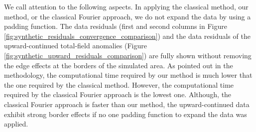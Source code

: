 We call attention to the following aspects. 
In applying the classical method, our method, or the classical Fourier approach, we do not expand the data by using a padding function.
The data residuals (first and second columns in Figure \ref{fig:synthetic_residuals_convergence_comparison})
and the data residuals of the upward-continued total-field anomalies 
(Figure \ref{fig:synthetic_upward_residuals_comparison}) are fully shown  without removing the  edge effects at the borders of the simulated area. 
As pointed out in the methodology, the computational time required by our method is much lower that the one required by the classical method.
However, the computational time required by the classical Fourier approach is the lowest one.
Although, the classical Fourier approach is faster than our method, the upward-continued data exhibit strong border effects if no one padding function to expand the data was applied. 


